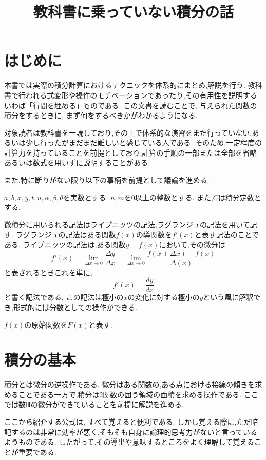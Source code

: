 ﻿\documentclass[dvipdfmx,a4paper,11pt,fleqn]{jsarticle}
\title{\vspace{-3em}教科書に乗っていない積分の話}
\begin{document}
\date{}
\author{}
\maketitle
\vspace{-5em}

\section{はじめに}

本書では実際の積分計算におけるテクニックを体系的にまとめ,解説を行う.
教科書で行われる式変形や操作のモチベーションであったり,その有用性を説明する.
いわば「行間を埋める」ものである.
この文書を読むことで, 与えられた関数の積分をするときに,
まず何をするべきかがわかるようになる.

対象読者は教科書を一読しており,その上で体系的な演習をまだ行っていない,あるいは少し行ったがまだまだ難しいと感じている人である.
そのため,一定程度の計算力を持っていることを前提としており,計算の手順の一部または全部を省略あるいは数式を用いずに説明することがある.

また,特に断りがない限り以下の事柄を前提として議論を進める.

$a,b,x,y,t,u,\alpha,\beta,\theta$を実数とする.
$n,m$を0以上の整数とする.
また,$C$は積分定数とする.

微積分に用いられる記法はライプニッツの記法,ラグランジュの記法を用いて記す.
ラグランジュの記法はある関数$f(x)$の導関数を$f'(x)$と表す記法のことである.
ライプニッツの記法は,ある関数$y=f(x)$において,その微分は
\[
f'(x)=\lim_{\Delta x \to 0} \frac{\Delta y}{\Delta x}=\lim_{\Delta x \to 0} \frac{f(x+\Delta x)-f(x)}{\Delta(x)}
\]
と表されるときこれを単に,
\[
f'(x)=\frac{dy}{dx}
\]
と書く記法である.
この記法は極小の$x$の変化に対する極小の$y$という風に解釈でき,形式的には分数としての操作ができる.

$f(x)$の原始関数を$F(x)$と表す.

\section{積分の基本}

積分とは微分の逆操作である.
微分はある関数の,ある点における接線の傾きを求めることである一方で,積分は2関数の囲う領域の面積を求める操作である.
ここでは数Ⅲの微分ができていることを前提に解説を進める.

ここから紹介する公式は, すべて覚えると便利である.
しかし覚える際に,ただ暗記するのは非常に効率が悪く,そもそも自身に論理的思考力がないと言っているようものである.
したがって,その導出や意味するところをよく理解して覚えることが重要である.
\end{document}
